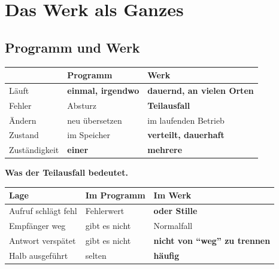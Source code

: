 \part{Das Werk als Ganzes}

\chapter{Programm und Werk}\label{kap:werk}

\begin{merksatz}
\begin{center}
\renewcommand{\arraystretch}{1.5}
\begin{tabular}{@{}P{2.6cm}P{2.6cm}P{3.0cm}@{}}
\toprule
& \textbf{Programm} & \textbf{Werk}\\
\midrule
Läuft & \textbf{einmal, irgendwo} & \textbf{dauernd, an vielen Orten}\\
Fehler & \textcolor{mittel}{Absturz} & \textcolor{akzent}{\textbf{Teilausfall}}\\
Ändern & neu übersetzen & \textcolor{akzent}{im laufenden Betrieb}\\
Zustand & im Speicher & \textcolor{akzent}{\textbf{verteilt, dauerhaft}}\\
Zuständigkeit & \textbf{einer} & \textcolor{akzent}{\textbf{mehrere}}\\
\bottomrule
\end{tabular}
\end{center}

\begin{center}
\begin{minipage}{0.88\textwidth}
\end{minipage}
\end{center}

\textbf{Was der Teilausfall bedeutet.}

\begin{center}
{\small
\renewcommand{\arraystretch}{1.45}
\begin{tabular}{@{}P{2.8cm}P{2.6cm}P{2.6cm}@{}}
\toprule
\textbf{Lage} & \textbf{Im Programm} & \textbf{Im Werk}\\
\midrule
Aufruf schlägt fehl & \textcolor{gruen}{Fehlerwert} & \textcolor{akzent}{\textbf{oder Stille}}\\
Empfänger weg & \textcolor{akzent}{gibt es nicht} & \textcolor{akzent}{Normalfall}\\
Antwort verspätet & \textcolor{akzent}{gibt es nicht} & \textcolor{akzent}{\textbf{nicht von \enquote{weg} zu trennen}}\\
Halb ausgeführt & \textcolor{gruen}{selten} & \textcolor{akzent}{\textbf{häufig}}\\
\bottomrule
\end{tabular}}
\end{center}


\end{merksatz}
